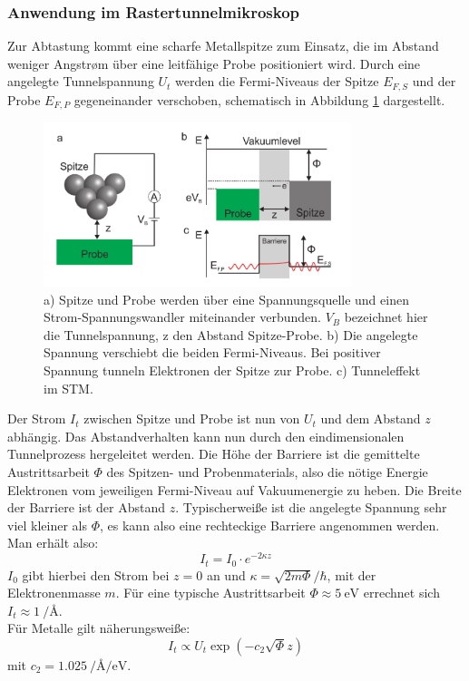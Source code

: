         \subsubsection{Anwendung im Rastertunnelmikroskop}

Zur Abtastung kommt eine scharfe Metallspitze zum Einsatz, die im Abstand weniger
Angstrøm über eine leitfähige Probe positioniert wird. Durch eine angelegte 
Tunnelspannung $U_t$ werden die Fermi-Niveaus der Spitze $E_{F,S}$ und der Probe
$E_{F,P}$ gegeneinander verschoben, schematisch in Abbildung \ref{tunnelstm} 
dargestellt.
\begin{figure}
    \centering
    \includegraphics[width=0.8\textwidth]{Abb/tunnel_stm.png}
    \caption{a) Spitze und Probe werden über eine Spannungsquelle und einen 
                Strom-Spannungswandler miteinander verbunden. $V_B$ bezeichnet
                hier die Tunnelspannung, z den Abstand Spitze-Probe.
             b) Die angelegte Spannung verschiebt die beiden Fermi-Niveaus. Bei 
                positiver Spannung tunneln Elektronen der Spitze zur Probe.
             c) Tunneleffekt im STM.
             \cite{hofmann}}
    \label{tunnelstm}
\end{figure}
Der Strom $I_t$ zwischen Spitze und Probe ist nun von $U_t$ und dem Abstand $z$ 
abhängig. Das Abstandverhalten kann nun durch den eindimensionalen Tunnelprozess
hergeleitet werden. Die Höhe der Barriere ist die gemittelte Austrittsarbeit $\Phi$
des Spitzen- und Probenmaterials, also die nötige Energie Elektronen vom jeweiligen
Fermi-Niveau auf Vakuumenergie zu heben. Die Breite der Barriere ist der Abstand $z$.
Typischerweiße ist die angelegte Spannung sehr viel kleiner als $\Phi$, es kann also
eine rechteckige Barriere angenommen werden. Man erhält also:
\[
    I_t = I_0 \cdot e^{-2\kappa z}    
\]
$I_0$ gibt hierbei den Strom bei $z=0$ an und $\kappa = \sqrt{2m \Phi}/ \hbar$, mit
der Elektronenmasse $m$. Für eine typische Austrittsarbeit $\Phi \approx \SI{5}{\eV}$
errechnet sich $I_t \approx \SI{1}{\per \angstrom}$.\\
Für Metalle gilt näherungsweiße:
\[
    I_t \propto U_t \exp(-c_2 \sqrt{\Phi} z)
\]
mit $c_2 = \SI{1,025}{\per\angstrom\per\eV}$.
\cite{schwabl,hofmann}

